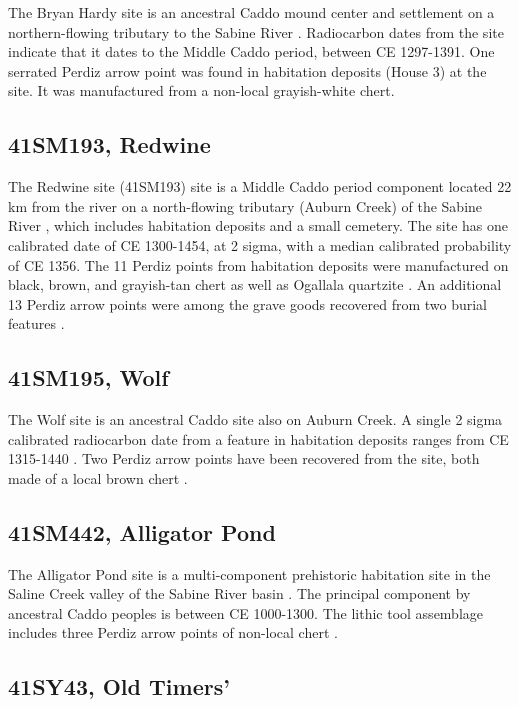\documentclass[review]{elsarticle}
\begin{document}
The Bryan Hardy site is an ancestral Caddo mound center and settlement on a northern-flowing tributary to the Sabine River \citep{RN3231}. Radiocarbon dates from the site indicate that it dates to the Middle Caddo period, between CE 1297-1391. One serrated Perdiz arrow point was found in habitation deposits (House 3) at the site. It was manufactured from a non-local grayish-white chert.

\subsection*{41SM193, Redwine}

The Redwine site (41SM193) site is a Middle Caddo period component located 22 km from the river on a north-flowing tributary (Auburn Creek) of the Sabine River \citep{RN3230}, which includes habitation deposits and a small cemetery. The site has one calibrated date of CE 1300-1454, at 2 sigma, with a median calibrated probability of CE 1356. The 11 Perdiz points from habitation deposits were manufactured on black, brown, and grayish-tan chert as well as Ogallala quartzite \citep[14]{RN3230}. An additional 13 Perdiz arrow points were among the grave goods recovered from two burial features \citep[35]{RN3230}.

\subsection*{41SM195, Wolf}

The Wolf site is an ancestral Caddo site also on Auburn Creek. A single 2 sigma calibrated radiocarbon date from a feature in habitation deposits ranges from CE 1315-1440 \citep{RN3220}. Two Perdiz arrow points have been recovered from the site, both made of a local brown chert \citep[4,5,Figure 8]{RN3220}.

\subsection*{41SM442, Alligator Pond}

The Alligator Pond site is a multi-component prehistoric habitation site in the Saline Creek valley of the Sabine River basin \citep{RN2375,RN2374}. The principal component by ancestral Caddo peoples is between CE 1000-1300. The lithic tool assemblage includes three Perdiz arrow points of non-local chert \citep[Figure 19c, e, j]{RN2374}.

\subsection*{41SY43, Old Timers'}
\end{document}
